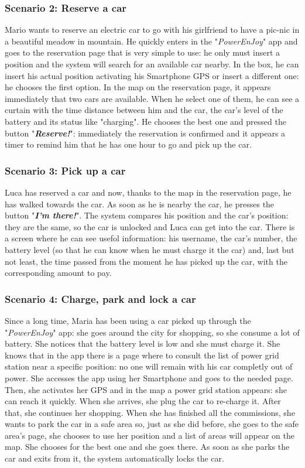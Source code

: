 \subsubsection{Scenario 2: Reserve a car} \label{sce2}
Mario wants to reserve an electric car to go with his girlfriend to have a pic-nic in a beautiful meadow in mountain. He quickly enters in the "\textit{PowerEnJoy}" app and goes to the reservation page that is very simple to use: he only must insert a position and the system will search for an available car nearby. In the box, he can insert his actual position activating his Smartphone GPS or insert a different one: he chooses the first option. In the map on the reservation page, it appears immediately that two cars are available. When he select one of them, he can see a curtain with the time distance between him and the car, the car's level of the battery and its status like "charging". He chooses the best one and pressed the button "\textbf{\textit{Reserve!}}": immediately the reservation is confirmed and it appears a timer to remind him that he has one hour to go and pick up the car.
\subsubsection{Scenario 3: Pick up a car} \label{sce3}
Luca has reserved a car and now, thanks to the map in the reservation page, he has walked towards the car. As soon as he is nearby the car, he presses the button "\textbf{\textit{I'm there!}}". The system compares his position and the car's position: they are the same, so the car is unlocked and Luca can get into the car. There is a screen where he can see usefol information: his username, the car's number, the battery level (so that he can know when he must charge it the car) and, last but not least, the time passed from the moment he has picked up the car, with the corresponding amount to pay.
\subsubsection{Scenario 4: Charge, park and lock a car} \label{sce4}
Since a long time, Maria has been using a car picked up through the "\textit{PowerEnJoy}" app: she goes around the city for shopping, so she consume a lot of battery. She notices that the battery level is low and she must charge it. She knows that in the app there is a page where to consult the list of power grid station near a specific position: no one will remain with his car completly out of power. She accesses the app using her Smartphone and goes to the needed page. Then, she activates her GPS and in the map a power grid station appears: she can reach it quickly. When she arrives, she plug the car to re-charge it. After that, she continues her shopping. When she has finished all the commissions, she wants to park the car in a safe area so, just as she did before, she goes to the safe area's page, she chooses to use her position and a list of areas will appear on the map. She chooses for the best one and she goes there. As soon as she parks the car and exits from it, the system automatically locks the car.  
